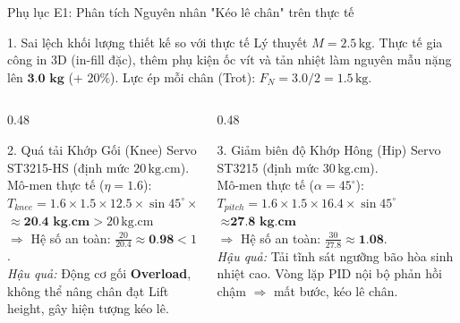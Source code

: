 \documentclass[10pt,aspectratio=169]{beamer}
\begin{document}
\begin{frame}{Phụ lục E1: Phân tích Nguyên nhân "Kéo lê chân" trên thực tế}
  \begin{block}{1. Sai lệch khối lượng thiết kế so với thực tế}
      Lý thuyết $M = 2.5\,\text{kg}$. Thực tế gia công in 3D (in-fill đặc), thêm phụ kiện ốc vít và tản nhiệt làm nguyên mẫu nặng lên $\textbf{3.0 kg}$ (+ $20\%$). Lực ép mỗi chân (Trot): $F_N = 3.0 / 2 = 1.5\,\text{kg}$.
  \end{block}
  \vspace{0.05cm}
  \begin{columns}[t]
      \begin{column}{0.48\textwidth}
          \begin{alertblock}{2. Quá tải Khớp Gối (Knee)}
              Servo ST3215-HS (định mức $20\,\text{kg.cm}$).\\
              Mô-men thực tế ($\eta=1.6$):\\
              $T_{knee} = 1.6 \times 1.5 \times 12.5 \times \sin45^\circ \times \frac{24}{25}$\\
              $\approx \textbf{20.4 kg.cm} > 20\,\text{kg.cm}$\\
              $\Rightarrow$ Hệ số an toàn: $\frac{20}{20.4} \approx \textbf{0.98} < 1$.\\
              \textit{Hậu quả:} Động cơ gối \textbf{Overload}, không thể nâng chân đạt Lift height, gây hiện tượng kéo lê.
          \end{alertblock}
      \end{column}
      \begin{column}{0.48\textwidth}
          \begin{alertblock}{3. Giảm biên độ Khớp Hông (Hip)}
              Servo ST3215 (định mức $30\,\text{kg.cm}$).\\
              Mô-men thực tế ($\alpha=45^\circ$):\\
              $T_{pitch} = 1.6 \times 1.5 \times 16.4 \times \sin45^\circ$\\
              $\approx \textbf{27.8 kg.cm}$\\
              $\Rightarrow$ Hệ số an toàn: $\frac{30}{27.8} \approx \textbf{1.08}$.\\
              \textit{Hậu quả:} Tải tĩnh sát ngưỡng bão hòa sinh nhiệt cao. Vòng lặp PID nội bộ phản hồi chậm $\Rightarrow$ mất bước, kéo lê chân.
          \end{alertblock}
      \end{column}
  \end{columns}
\end{frame}
\end{document}
